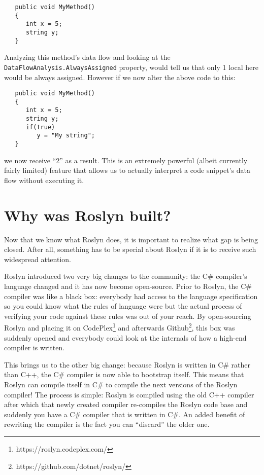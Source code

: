 \begin{lstlisting}
   public void MyMethod()
   {
      int x = 5;
      string y;
   }

\end{lstlisting}
	
Analyzing this method’s data flow and looking at the \verb|DataFlowAnalysis.AlwaysAssigned| property, would tell us that only 1 local here would be always assigned. However if we now alter the above code to this:

\begin{lstlisting}
   public void MyMethod()
   {
      int x = 5;
      string y;
      if(true)
         y = "My string";
   }
\end{lstlisting}
	
we now receive “2” as a result. This is an extremely powerful (albeit currently fairly limited) feature that allows us to actually interpret a code snippet’s data flow without executing it.


\section{Why was Roslyn built?}
\label{sec:intro-why}

Now that we know what Roslyn does, it is important to realize what gap is being closed. After all, something has to be special about Roslyn if it is to receive such widespread attention.

Roslyn introduced two very big changes to the community: the C\# compiler’s language changed and it has now become open-source. Prior to Roslyn, the C\# compiler was like a black box: everybody had access to the language specification so you could know what the rules of language were but the actual process of verifying your code against these rules was out of your reach. By open-sourcing Roslyn and placing it on CodePlex\footnote{https://roslyn.codeplex.com/} and afterwards Github\footnote{https://github.com/dotnet/roslyn/}, this box was suddenly opened and everybody could look at the internals of how a high-end compiler is written.

This brings us to the other big change: because Roslyn is written in C\# rather than C++, the C\# compiler is now able to bootstrap itself. This means that Roslyn can compile itself in C\# to compile the next versions of the Roslyn compiler! The process is simple: Roslyn is compiled using the old C++ compiler after which that newly created compiler re-compiles the Roslyn code base and suddenly you have a C\# compiler that is written in C\#. 
An added benefit of rewriting the compiler is the fact you can “discard” the older one.

